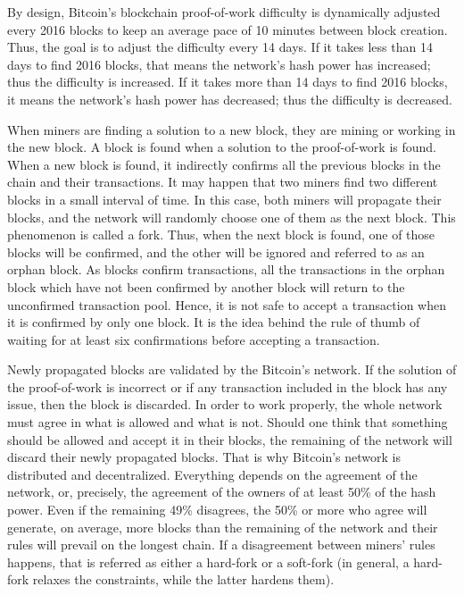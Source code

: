 By design, Bitcoin's blockchain proof-of-work difficulty is dynamically adjusted every 2016 blocks to keep an average pace of 10 minutes between block creation. Thus, the goal is to adjust the difficulty every 14 days. If it takes less than 14 days to find 2016 blocks, that means the network's hash power has increased; thus the difficulty is increased. If it takes more than 14 days to find 2016 blocks, it means the network's hash power has decreased; thus the difficulty is decreased.

When miners are finding a solution to a new block, they are mining or working in the new block. A block is found when a solution to the proof-of-work is found. When a new block is found, it indirectly confirms all the previous blocks in the chain and their transactions. It may happen that two miners find two different blocks in a small interval of time. In this case, both miners will propagate their blocks, and the network will randomly choose one of them as the next block. This phenomenon is called a fork. Thus, when the next block is found, one of those blocks will be confirmed, and the other will be ignored and referred to as an orphan block. As blocks confirm transactions, all the transactions in the orphan block which have not been confirmed by another block will return to the unconfirmed transaction pool. Hence, it is not safe to accept a transaction when it is confirmed by only one block. It is the idea behind the rule of thumb of waiting for at least six confirmations before accepting a transaction.

Newly propagated blocks are validated by the Bitcoin's network. If the solution of the proof-of-work is incorrect or if any transaction included in the block has any issue, then the block is discarded. In order to work properly, the whole network must agree in what is allowed and what is not. Should one think that something should be allowed and accept it in their blocks, the remaining of the network will discard their newly propagated blocks. That is why Bitcoin's network is distributed and decentralized. Everything depends on the agreement of the network, or, precisely, the agreement of the owners of at least 50\% of the hash power. Even if the remaining 49\% disagrees, the 50\% or more who agree will generate, on average, more blocks than the remaining of the network and their rules will prevail on the longest chain. If a disagreement between miners' rules happens, that is referred as either a hard-fork or a soft-fork (in general, a hard-fork relaxes the constraints, while the latter hardens them).

